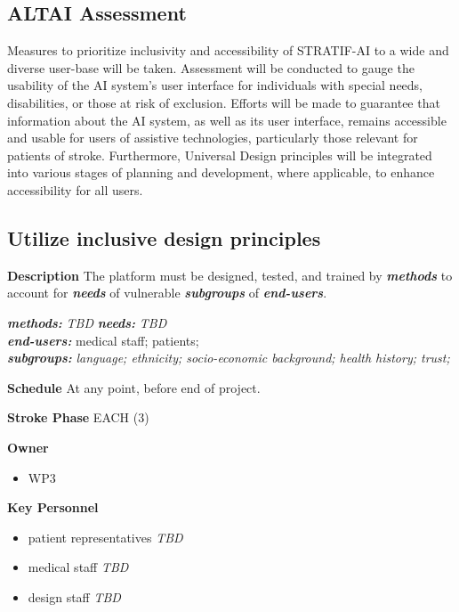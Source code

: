 \documentclass[
  letterpaper,
  DIV=11,
  numbers=noendperiod]{scrreport}
\providecommand{\tightlist}{%
  \setlength{\itemsep}{0pt}\setlength{\parskip}{0pt}}\usepackage{longtable,booktabs,array}
\begin{document}
\hypertarget{altai-assessment-12}{%
\subsection*{ALTAI Assessment}\label{altai-assessment-12}}

Measures to prioritize inclusivity and accessibility of STRATIF-AI to a
wide and diverse user-base will be taken. Assessment will be conducted
to gauge the usability of the AI system's user interface for individuals
with special needs, disabilities, or those at risk of exclusion. Efforts
will be made to guarantee that information about the AI system, as well
as its user interface, remains accessible and usable for users of
assistive technologies, particularly those relevant for patients of
stroke. Furthermore, Universal Design principles will be integrated into
various stages of planning and development, where applicable, to enhance
accessibility for all users.

\hypertarget{utilize-inclusive-design-principles}{%
\subsection{Utilize inclusive design
principles}\label{utilize-inclusive-design-principles}}

\textbf{Description} The platform must be designed, tested, and trained
by \textbf{\emph{methods}} to account for \textbf{\emph{needs}} of
vulnerable \textbf{\emph{subgroups}} of \textbf{\emph{end-users}}.

\textbf{\emph{methods:}} \emph{TBD} \textbf{\emph{needs:}} \emph{TBD}\\
\textbf{\emph{end-users:}} medical staff; patients;\\
\textbf{\emph{subgroups:}} \emph{language; ethnicity; socio-economic
background; health history; trust;}

\textbf{Schedule} At any point, before end of project.

\textbf{Stroke Phase} EACH (3)

\textbf{Owner}

\begin{itemize}
\tightlist
\item
  WP3
\end{itemize}

\textbf{Key Personnel}

\begin{itemize}
\tightlist
\item
  patient representatives \emph{TBD}
\item
  medical staff \emph{TBD}
\item
  design staff \emph{TBD}
\end{itemize}
\end{document}
